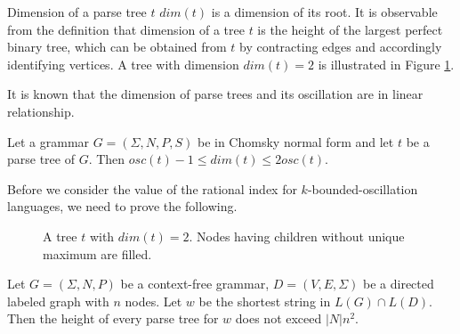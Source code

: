 Dimension of a parse tree $t$ $dim(t)$ is a dimension of its root.  It is observable from the definition that dimension of a tree $t$ is the height of the largest perfect binary tree, which can be obtained from $t$ by contracting edges and accordingly identifying vertices. A tree with dimension $dim(t) = 2$ is illustrated in Figure \ref{oscbtree}.


It is known that the dimension of parse trees and its oscillation are in linear relationship.

\begin{lemma}
\label{boscdim}
Let a grammar $G = (\Sigma, N, P, S)$ be in Chomsky normal form and let $t$ be a parse tree of $G$. Then $osc(t) - 1 \le dim(t) \le 2osc(t)$.
\end{lemma}

Before we consider the value of the rational index for $k$-bounded-oscillation languages, we need to prove the following.
\begin{figure}
\centering
{}
\caption{A tree $t$ with $dim(t)=2$. Nodes having children without unique maximum are filled.}
\label{oscbtree}            
\end{figure}
\begin{lemma}
\label{lem:treeheight}
Let  $G = (\Sigma, N, P)$ be a context-free grammar,  $D=(V, E, \Sigma)$ be a directed labeled graph with $n$ nodes. Let $w$ be the shortest string in $L(G)\cap L(D)$. Then the height of every parse tree for $w$ does not exceed $|N|n^2$.
\end{lemma}

